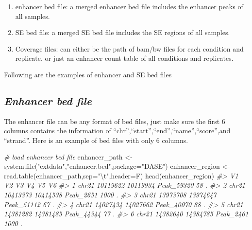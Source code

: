 \documentclass[
]{article}
\newenvironment{Shaded}{\begin{snugshade}}{\end{snugshade}}
\newcommand{\AttributeTok}[1]{\textcolor[rgb]{0.77,0.63,0.00}{#1}}
\newcommand{\CommentTok}[1]{\textcolor[rgb]{0.56,0.35,0.01}{\textit{#1}}}
\newcommand{\FunctionTok}[1]{\textcolor[rgb]{0.00,0.00,0.00}{#1}}
\newcommand{\NormalTok}[1]{#1}
\newcommand{\OtherTok}[1]{\textcolor[rgb]{0.56,0.35,0.01}{#1}}
\newcommand{\SpecialCharTok}[1]{\textcolor[rgb]{0.00,0.00,0.00}{#1}}
\newcommand{\StringTok}[1]{\textcolor[rgb]{0.31,0.60,0.02}{#1}}
\providecommand{\tightlist}{%
  \setlength{\itemsep}{0pt}\setlength{\parskip}{0pt}}
\begin{document}
\begin{enumerate}
\def\labelenumi{\arabic{enumi}.}
\tightlist
\item
  enhancer bed file: a merged enhancer bed file includes the enhancer
  peaks of all samples.
\item
  SE bed file: a merged SE bed file includes the SE regions of all
  samples.
\item
  Coverage files: can either be the path of bam/bw files for each
  condition and replicate, or just an enhancer count table of all
  conditions and replicates.
\end{enumerate}

Following are the examples of enhancer and SE bed files

\hypertarget{enhancer-bed-file}{%
\subsection{\texorpdfstring{\emph{Enhancer bed
file}}{Enhancer bed file}}\label{enhancer-bed-file}}

The enhancer file can be any format of bed files, just make sure the
first 6 columns contains the information of
``chr'',``start'',``end'',``name'',``score'',and ``strand''. Here is an
example of bed files with only 6 columns.

\begin{Shaded}
\begin{Highlighting}[]
\CommentTok{\# load enhancer bed file}
\NormalTok{enhancer\_path }\OtherTok{\textless{}{-}} \FunctionTok{system.file}\NormalTok{(}\StringTok{"extdata"}\NormalTok{,}\StringTok{"enhancer.bed"}\NormalTok{,}\AttributeTok{package=}\StringTok{"DASE"}\NormalTok{)}
\NormalTok{enhancer\_region }\OtherTok{\textless{}{-}} \FunctionTok{read.table}\NormalTok{(enhancer\_path,}\AttributeTok{sep=}\StringTok{"}\SpecialCharTok{\textbackslash{}t}\StringTok{"}\NormalTok{,}\AttributeTok{header=}\NormalTok{F)}
\FunctionTok{head}\NormalTok{(enhancer\_region)}
\CommentTok{\#\textgreater{}      V1       V2       V3         V4   V5 V6}
\CommentTok{\#\textgreater{} 1 chr21 10119622 10119934 Peak\_59320   58  .}
\CommentTok{\#\textgreater{} 2 chr21 10413373 10414538  Peak\_2651 1000  .}
\CommentTok{\#\textgreater{} 3 chr21 13973708 13974647 Peak\_51112   67  .}
\CommentTok{\#\textgreater{} 4 chr21 14027434 14027662 Peak\_40070   88  .}
\CommentTok{\#\textgreater{} 5 chr21 14381282 14381485 Peak\_44344   77  .}
\CommentTok{\#\textgreater{} 6 chr21 14382640 14384785  Peak\_2461 1000  .}
\end{Highlighting}
\end{Shaded}
\end{document}
